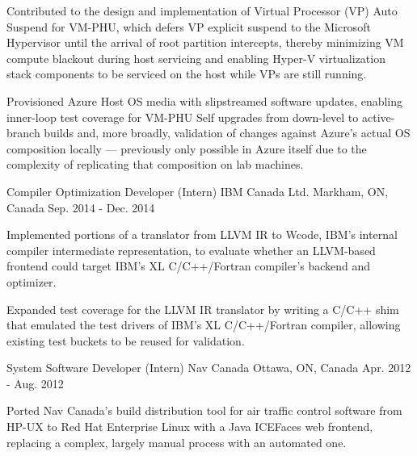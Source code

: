 \begin{cventries}
{\begin{cvitems}
{        Contributed to the design and implementation of Virtual Processor (VP) Auto
        Suspend for VM-PHU, which defers VP explicit suspend to the Microsoft Hypervisor until
        the arrival of root partition intercepts, thereby minimizing VM compute
        blackout during host servicing and enabling Hyper-V virtualization stack
        components to be serviced on the host while VPs are still running.
      }
      \item {
        Provisioned Azure Host OS media with slipstreamed software updates, enabling
        inner-loop test coverage for VM-PHU Self upgrades from down-level to
        active-branch builds and, more broadly, validation of changes against Azure's
        actual OS composition locally — previously only possible in Azure itself due
        to the complexity of replicating that composition on lab machines.
      }
    \end{cvitems}
  }

  \cventry
    {Compiler Optimization Developer (Intern)} %
    {IBM Canada Ltd.} %
    {Markham, ON, Canada} %
    {Sep. 2014 - Dec. 2014} %
    {
      \begin{cvitems} %
        \item {
          Implemented portions of a translator from LLVM IR to Wcode, IBM's internal
          compiler intermediate representation, to evaluate whether an LLVM-based
          frontend could target IBM's XL C/C++/Fortran compiler's backend and
          optimizer.
        }
        \item {
          Expanded test coverage for the LLVM IR translator by writing a C/C++ shim
          that emulated the test drivers of IBM's XL C/C++/Fortran compiler, allowing
          existing test buckets to be reused for validation.
        }
      \end{cvitems}
    }

  \cventry
    {System Software Developer (Intern)} %
    {Nav Canada} %
    {Ottawa, ON, Canada} %
    {Apr. 2012 - Aug. 2012} %
    {
      \begin{cvitems} %
        \item {
          Ported Nav Canada's build distribution tool for air traffic control software
          from HP-UX to Red Hat Enterprise Linux with a Java ICEFaces web frontend,
          replacing a complex, largely manual process with an automated one.
        }
      \end{cvitems}
    }

\end{cventries}
